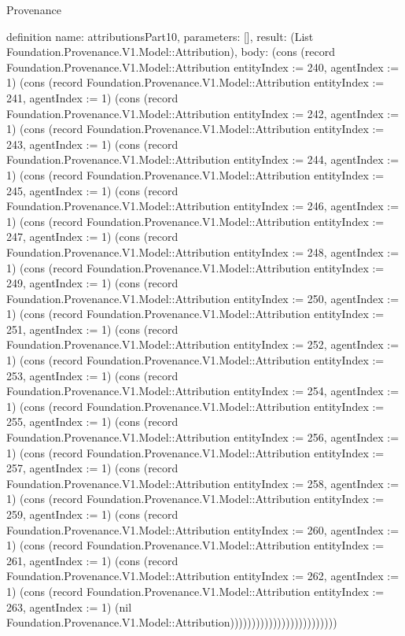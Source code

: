 \begin{lexlean}{Provenance}
\begin{semanticmodule}
definition{
  name: attributionsPart10,
  parameters: [],
  result: (List Foundation.Provenance.V1.Model::Attribution),
  body: (cons (record Foundation.Provenance.V1.Model::Attribution {entityIndex := 240, agentIndex := 1}) (cons (record Foundation.Provenance.V1.Model::Attribution {entityIndex := 241, agentIndex := 1}) (cons (record Foundation.Provenance.V1.Model::Attribution {entityIndex := 242, agentIndex := 1}) (cons (record Foundation.Provenance.V1.Model::Attribution {entityIndex := 243, agentIndex := 1}) (cons (record Foundation.Provenance.V1.Model::Attribution {entityIndex := 244, agentIndex := 1}) (cons (record Foundation.Provenance.V1.Model::Attribution {entityIndex := 245, agentIndex := 1}) (cons (record Foundation.Provenance.V1.Model::Attribution {entityIndex := 246, agentIndex := 1}) (cons (record Foundation.Provenance.V1.Model::Attribution {entityIndex := 247, agentIndex := 1}) (cons (record Foundation.Provenance.V1.Model::Attribution {entityIndex := 248, agentIndex := 1}) (cons (record Foundation.Provenance.V1.Model::Attribution {entityIndex := 249, agentIndex := 1}) (cons (record Foundation.Provenance.V1.Model::Attribution {entityIndex := 250, agentIndex := 1}) (cons (record Foundation.Provenance.V1.Model::Attribution {entityIndex := 251, agentIndex := 1}) (cons (record Foundation.Provenance.V1.Model::Attribution {entityIndex := 252, agentIndex := 1}) (cons (record Foundation.Provenance.V1.Model::Attribution {entityIndex := 253, agentIndex := 1}) (cons (record Foundation.Provenance.V1.Model::Attribution {entityIndex := 254, agentIndex := 1}) (cons (record Foundation.Provenance.V1.Model::Attribution {entityIndex := 255, agentIndex := 1}) (cons (record Foundation.Provenance.V1.Model::Attribution {entityIndex := 256, agentIndex := 1}) (cons (record Foundation.Provenance.V1.Model::Attribution {entityIndex := 257, agentIndex := 1}) (cons (record Foundation.Provenance.V1.Model::Attribution {entityIndex := 258, agentIndex := 1}) (cons (record Foundation.Provenance.V1.Model::Attribution {entityIndex := 259, agentIndex := 1}) (cons (record Foundation.Provenance.V1.Model::Attribution {entityIndex := 260, agentIndex := 1}) (cons (record Foundation.Provenance.V1.Model::Attribution {entityIndex := 261, agentIndex := 1}) (cons (record Foundation.Provenance.V1.Model::Attribution {entityIndex := 262, agentIndex := 1}) (cons (record Foundation.Provenance.V1.Model::Attribution {entityIndex := 263, agentIndex := 1}) (nil Foundation.Provenance.V1.Model::Attribution)))))))))))))))))))))))))
}


\end{semanticmodule}
\end{lexlean}
